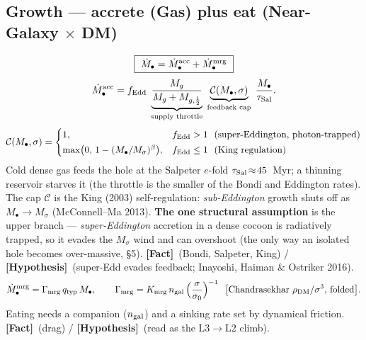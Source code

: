 \documentclass[11pt]{article}
\newcommand{\Fact}{\textbf{\textcolor{green!45!black}{[Fact]}}}
\newcommand{\Hyp}{\textbf{\textcolor{blue!55!black}{[Hypothesis]}}}
\newcommand{\Mbh}{M_{\bullet}}
\newcommand{\Msig}{M_\sigma}
\begin{document}
\subsection{Growth --- accrete (Gas) plus eat (Near-Galaxy $\times$ DM)}
\begin{equation}
\boxed{\ \dot\Mbh=\dot\Mbh^{\rm acc}+\dot\Mbh^{\rm mrg}\ }
\end{equation}
\begin{equation}
\dot\Mbh^{\rm acc}=f_{\rm Edd}\;\underbrace{\frac{M_g}{M_g+M_{g,\frac12}}}_{\text{supply throttle}}\;\underbrace{\mathcal{C}(\Mbh,\sigma)}_{\text{feedback cap}}\;\frac{\Mbh}{\tau_{\rm Sal}}.
\label{eq:acc}
\end{equation}
\begin{equation}
\mathcal{C}(\Mbh,\sigma)=\begin{cases}1, & f_{\rm Edd}>1\ \ (\text{super-Eddington, photon-trapped})\\[2pt] \max\!\big(0,\,1-(\Mbh/\Msig)^{\beta}\big), & f_{\rm Edd}\le1\ \ (\text{King regulation})\end{cases}
\end{equation}
Cold dense gas feeds the hole at the Salpeter $e$-fold $\tau_{\rm Sal}\!\approx\!45$~Myr; a thinning reservoir starves it (the throttle is the smaller of the Bondi and Eddington rates). The cap $\mathcal C$ is the King (2003) self-regulation: \emph{sub-Eddington} growth shuts off as $\Mbh\!\to\!\Msig$ (McConnell--Ma 2013). \textbf{The one structural assumption} is the upper branch --- \emph{super-Eddington} accretion in a dense cocoon is radiatively trapped, so it evades the $\Msig$ wind and can overshoot (the only way an isolated hole becomes over-massive, \S5). \Fact\ (Bondi, Salpeter, King) / \Hyp\ (super-Edd evades feedback; Inayoshi, Haiman \& Ostriker 2016).
\begin{equation}
\dot\Mbh^{\rm mrg}=\Gamma_{\rm mrg}\,q_{\rm typ}\,\Mbh,\qquad
\Gamma_{\rm mrg}=K_{\rm mrg}\,n_{\rm gal}\,\Big(\frac{\sigma}{\sigma_0}\Big)^{-1}\ \ \big[\text{Chandrasekhar }\rho_{\rm DM}/\sigma^3\text{, folded}\big].
\label{eq:mrg}
\end{equation}
Eating needs a companion ($n_{\rm gal}$) and a sinking rate set by dynamical friction. \Fact\ (drag) / \Hyp\ (read as the L3$\to$L2 climb).
\end{document}

